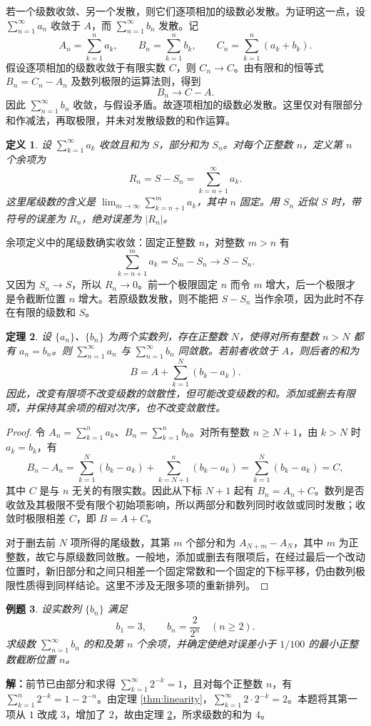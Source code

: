 \documentclass[UTF8,fontset=fandol,11pt]{ctexart}
\newtheorem{definition}{定义}[section]
\newtheorem{theorem}[definition]{定理}
\newtheorem{example}[definition]{例题}
\begin{document}
若一个级数收敛、另一个发散，则它们逐项相加的级数必发散。为证明这一点，设 $\sum_{n=1}^{\infty}a_n$ 收敛于 $A$，而 $\sum_{n=1}^{\infty}b_n$ 发散。记
\[
A_n=\sum_{k=1}^{n}a_k,\qquad B_n=\sum_{k=1}^{n}b_k,\qquad C_n=\sum_{k=1}^{n}(a_k+b_k).
\]
假设逐项相加的级数收敛于有限实数 $C$，则 $C_n\to C$。由有限和的恒等式 $B_n=C_n-A_n$ 及数列极限的运算法则，得到
\[
B_n\longrightarrow C-A.
\]
因此 $\sum_{n=1}^{\infty}b_n$ 收敛，与假设矛盾。故逐项相加的级数必发散。这里仅对有限部分和作减法，再取极限，并未对发散级数的和作运算。\par
\begin{definition}
\label{def:remainder}设 $\sum_{k=1}^{\infty}a_k$ 收敛且和为 $S$，部分和为 $S_n$。对每个正整数 $n$，定义第 $n$ 个余项为
\[
R_n=S-S_n=\sum_{k=n+1}^{\infty}a_k.
\]
这里尾级数的含义是 $\lim_{m\to\infty}\sum_{k=n+1}^{m}a_k$，其中 $n$ 固定。用 $S_n$ 近似 $S$ 时，带符号的误差为 $R_n$，绝对误差为 $|R_n|$。
\end{definition}
余项定义中的尾级数确实收敛：固定正整数 $n$，对整数 $m>n$ 有
\[
\sum_{k=n+1}^{m}a_k=S_m-S_n\longrightarrow S-S_n.
\]
又因为 $S_n\to S$，所以 $R_n\to0$。前一个极限固定 $n$ 而令 $m$ 增大，后一个极限才是令截断位置 $n$ 增大。若原级数发散，则不能把 $S-S_n$ 当作余项，因为此时不存在有限的级数和 $S$。\par
\begin{theorem}
\label{thm:finite-change}设 $\{a_n\}$、$\{b_n\}$ 为两个实数列，存在正整数 $N$，使得对所有整数 $n>N$ 都有 $a_n=b_n$。则 $\sum_{n=1}^{\infty}a_n$ 与 $\sum_{n=1}^{\infty}b_n$ 同敛散。若前者收敛于 $A$，则后者的和为
\[
B=A+\sum_{k=1}^{N}(b_k-a_k).
\]
因此，改变有限项不改变级数的敛散性，但可能改变级数的和。添加或删去有限项，并保持其余项的相对次序，也不改变敛散性。
\end{theorem}
\begin{proof}
令 $A_n=\sum_{k=1}^{n}a_k$、$B_n=\sum_{k=1}^{n}b_k$。对所有整数 $n\geq N+1$，由 $k>N$ 时 $a_k=b_k$，有
\[
B_n-A_n=\sum_{k=1}^{N}(b_k-a_k)+\sum_{k=N+1}^{n}(b_k-a_k)
=\sum_{k=1}^{N}(b_k-a_k)=C,
\]
其中 $C$ 是与 $n$ 无关的有限实数。因此从下标 $N+1$ 起有 $B_n=A_n+C$。数列是否收敛及其极限不受有限个初始项影响，所以两部分和数列同时收敛或同时发散；收敛时极限相差 $C$，即 $B=A+C$。

对于删去前 $N$ 项所得的尾级数，其第 $m$ 个部分和为 $A_{N+m}-A_N$，其中 $m$ 为正整数，故它与原级数同敛散。一般地，添加或删去有限项后，在经过最后一个改动位置时，新旧部分和之间只相差一个固定常数和一个固定的下标平移，仍由数列极限性质得到同样结论。这里不涉及无限多项的重新排列。
\end{proof}
\begin{example}
设实数列 $\{b_n\}$ 满足
\[
b_1=3,\qquad b_n=\frac{2}{2^n}\quad(n\geq2).
\]
求级数 $\sum_{n=1}^{\infty}b_n$ 的和及第 $n$ 个余项，并确定使绝对误差小于 $1/100$ 的最小正整数截断位置 $n$。
\end{example}
\par\noindent\textbf{解：}前节已由部分和求得 $\sum_{k=1}^{\infty}2^{-k}=1$，且对每个正整数 $n$，有 $\sum_{k=1}^{n}2^{-k}=1-2^{-n}$。由定理 \ref{thm:linearity}，$\sum_{k=1}^{\infty}2\cdot2^{-k}=2$。本题将其第一项从 $1$ 改成 $3$，增加了 $2$，故由定理 \ref{thm:finite-change}，所求级数的和为 $4$。
\end{document}
